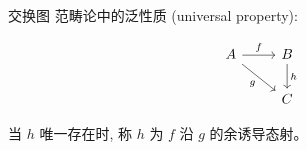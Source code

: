 
\begin{frame}[fragile]{交换图}
  范畴论中的泛性质 (universal property):

  \[
    \begin{tikzcd}
      A \arrow[r, "f"] \arrow[rd, "g"'] & B \arrow[d, "h"] \\
      & C
    \end{tikzcd}
  \]

  \pause

  当 $h$ 唯一存在时, 称 $h$ 为 $f$ 沿 $g$ 的余诱导态射。
\end{frame}
